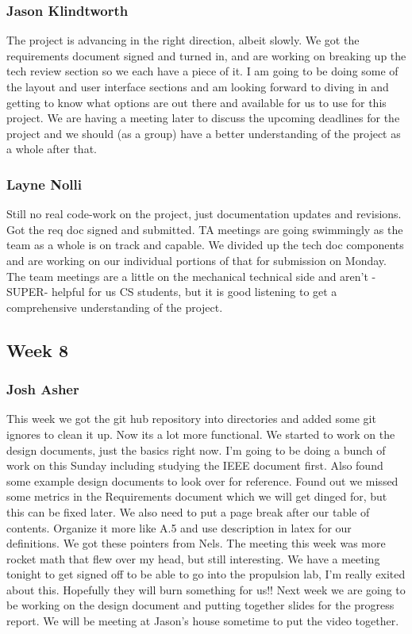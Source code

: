 \documentclass[10pt,draftclsnofoot,onecolumn]{IEEEtran}
\begin{document}
\subsubsection{Jason Klindtworth}The project is advancing in the right direction, albeit slowly. We got the requirements document signed and turned in, and are working on breaking up the tech review section so we each have a piece of it. I am going to be doing some of the layout and user interface sections and am looking forward to diving in and getting to know what options are out there and available for us to use for this project. We are having a meeting later to discuss the upcoming deadlines for the project and we should (as a group) have a better understanding of the project as a whole after that.

\subsubsection{Layne Nolli} Still no real code-work on the project, just documentation updates and revisions. Got the req doc signed and submitted. TA meetings are going swimmingly as the team as a whole is on track and capable. We divided up the tech doc components and are working on our individual portions of that for submission on Monday. The team meetings are a little on the mechanical technical side and aren't -SUPER- helpful for us CS students, but it is good listening to get a comprehensive understanding of the project.

\subsection{Week 8}

\subsubsection{Josh Asher} This week we got the git hub repository into directories and added some git ignores to clean it up. Now its a lot more functional. We started to work on the design documents, just the basics right now. I'm going to be doing a bunch of work on this Sunday including studying the IEEE document first. Also found some example design documents to look over for reference. Found out we missed some metrics in the Requirements document which we will get dinged for, but this can be fixed later. We also need to put a page break after our table of contents. Organize it more like A.5 and use description in latex for our definitions. We got these pointers from Nels. The meeting this week was more rocket math that flew over my head, but still interesting. We have a meeting tonight to get signed off to be able to go into the propulsion lab, I'm really exited about this. Hopefully they will burn something for us!! Next week we are going to be working on the design document and putting together slides for the progress report. We will be meeting at Jason's house sometime to put the video together.
\end{document}
